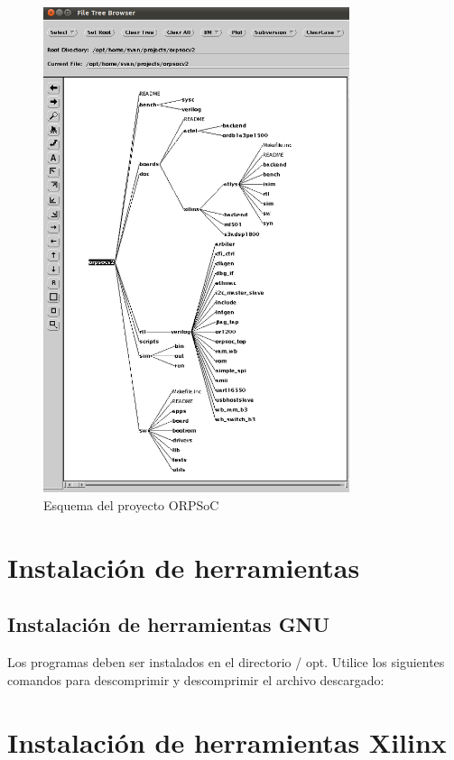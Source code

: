\begin{figure}[h!]
 \begin{center}
  \includegraphics[width=0.8\textwidth,keepaspectratio=true]{./images/proyectoorpsoc}
  \caption{Esquema del proyecto ORPSoC }
  \label{fig:esquema}
 \end{center}
\end{figure}

 \section{Instalación de herramientas}
 \subsection{Instalación de herramientas GNU}

Los programas deben ser instalados en el directorio / opt. Utilice los siguientes comandos para descomprimir y descomprimir el archivo descargado: 


 \section{Instalación de herramientas Xilinx}

